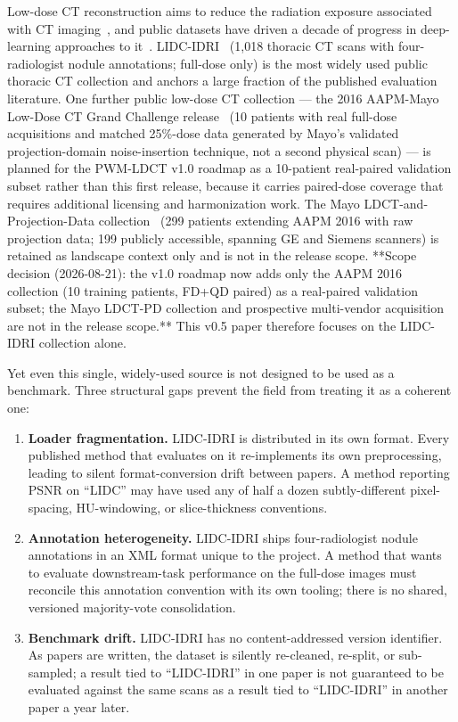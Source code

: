 \documentclass[twoside,11pt]{article}
\begin{document}
Low-dose CT reconstruction aims to reduce the radiation exposure associated with CT imaging~\citep{brenner2007ct}, and public datasets have driven a decade of progress in deep-learning approaches to it~\citep{chen2017redcnn,wang2020deeplearningreview,diwakar2018review,willemink2019evolution}. LIDC-IDRI~\citep{lidc_idri} (1{,}018 thoracic CT scans with four-radiologist nodule annotations; full-dose only) is the most widely used public thoracic CT collection and anchors a large fraction of the published evaluation literature. One further public low-dose CT collection --- the 2016 AAPM-Mayo Low-Dose CT Grand Challenge release~\citep{aapm2016challenge} (10 patients with real full-dose acquisitions and matched 25\%-dose data generated by Mayo's validated projection-domain noise-insertion technique, not a second physical scan) --- is planned for the PWM-LDCT v1.0 roadmap as a 10-patient real-paired validation subset rather than this first release, because it carries paired-dose coverage that requires additional licensing and harmonization work. The Mayo LDCT-and-Projection-Data collection~\citep{mccollough2020mayo} (299 patients extending AAPM 2016 with raw projection data; 199 publicly accessible, spanning GE and Siemens scanners) is retained as landscape context only and is not in the release scope. **Scope decision (2026-08-21): the v1.0 roadmap now adds only the AAPM 2016 collection (10 training patients, FD+QD paired) as a real-paired validation subset; the Mayo LDCT-PD collection and prospective multi-vendor acquisition are not in the release scope.** This v0.5 paper therefore focuses on the LIDC-IDRI collection alone.

Yet even this single, widely-used source is not designed to be used as a benchmark. Three structural gaps prevent the field from treating it as a coherent one:

\begin{enumerate}
    \item \textbf{Loader fragmentation.} LIDC-IDRI is distributed in its own format. Every published method that evaluates on it re-implements its own preprocessing, leading to silent format-conversion drift between papers. A method reporting PSNR on ``LIDC'' may have used any of half a dozen subtly-different pixel-spacing, HU-windowing, or slice-thickness conventions.
    \item \textbf{Annotation heterogeneity.} LIDC-IDRI ships four-radiologist nodule annotations in an XML format unique to the project. A method that wants to evaluate downstream-task performance on the full-dose images must reconcile this annotation convention with its own tooling; there is no shared, versioned majority-vote consolidation.
    \item \textbf{Benchmark drift.} LIDC-IDRI has no content-addressed version identifier. As papers are written, the dataset is silently re-cleaned, re-split, or sub-sampled; a result tied to ``LIDC-IDRI'' in one paper is not guaranteed to be evaluated against the same scans as a result tied to ``LIDC-IDRI'' in another paper a year later.
\end{enumerate}
\end{document}
